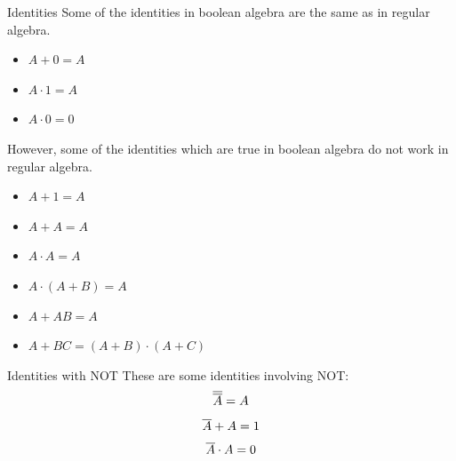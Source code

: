	\begin{namedframe}{Identities}
		Some of the identities in boolean algebra are the same as in regular algebra.
		\begin{itemize}[<+(1)->]
			\item $A + 0 = A$
			\item $A \cdot 1 = A$
			\item $A \cdot 0 = 0$
		\end{itemize}
		\pause
		However, some of the identities which are true in boolean algebra do not work in regular algebra.
		\begin{center}
			\begin{minipage}{0.25\textwidth}
				\begin{itemize}[<+(1)->]
					\item $A + 1 = A$
					\item $A + A = A$
					\item $A \cdot A = A$
				\end{itemize}
			\end{minipage}
			\begin{minipage}{0.65\textwidth}
				\begin{itemize}[<+(1)->]
					\item $A \cdot (A + B) = A$
					\item $A + AB = A$
					\item $A + BC = (A + B) \cdot (A + C)$
				\end{itemize}
			\end{minipage}
		\end{center}
	\end{namedframe}
	\begin{namedframe}{Identities with NOT}
		These are some identities involving NOT:
		\pause
		\[\overline{\overline{A}} = A\]
		\pause
		\[\overline{A} + A = 1\]
		\pause
		\[\overline{A} \cdot A = 0\]
	\end{namedframe}
